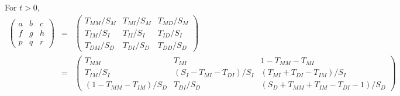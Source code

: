 \documentclass{article}
\begin{document}
For $t>0$, %
\begin{eqnarray*}
\begin{pmatrix}
a & b & c \\
f & g & h \\
p & q & r 
\end{pmatrix}
& = &
\begin{pmatrix}
T_{MM} / S_M & T_{MI} / S_M & T_{MD} / S_M \\
T_{IM} / S_I & T_{II} / S_I & T_{ID} / S_I \\
T_{DM} / S_D & T_{DI} / S_D & T_{DD} / S_D 
\end{pmatrix}
\\
& = &
\begin{pmatrix}
T_{MM} & T_{MI} & 1-T_{MM}-T_{MI} \\
T_{IM}/S_I & (S_I-T_{MI}-T_{DI})/S_I & (T_{MI}+T_{DI}-T_{IM})/S_I \\
(1-T_{MM}-T_{IM})/S_D & T_{DI}/S_D & (S_D+T_{MM}+T_{IM}-T_{DI}-1)/S_D 
\end{pmatrix}
\end{eqnarray*}
% 
\end{document}

